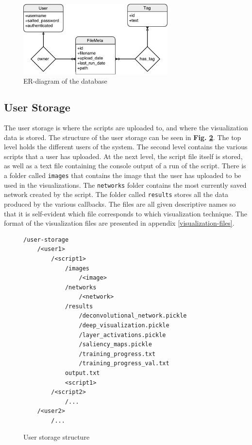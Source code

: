\begin{figure}[h!]
    \centering
        \includegraphics[width=0.7\textwidth]{fig/database-diagram.pdf}
        \caption{ER-diagram of the database}
        \label{database}
\end{figure}

\subsection{User Storage}

The user storage is where the scripts are uploaded to, and where the visualization data is stored. The structure of the user storage can be seen in \textbf{Fig. \ref{struct2}}. The top level holds the different users of the system. The second level contains the various scripts that a user has uploaded. At the next level, the script file itself is stored, as well as a text file containing the console output of a run of the script. There is a folder called \texttt{images} that contains the image that the user has uploaded to be used in the visualizations. The \texttt{networks} folder contains the most currently saved network created by the script. The folder called \texttt{results} stores all the data produced by the various callbacks. The files are all given descriptive names so that it is self-evident which file corresponds to which visualization technique. The format of the visualization files are presented in appendix \ref{visualization-files}.

\begin{figure}[h!]
\begin{verbatim}
/user-storage
    /<user1>
        /<script1>
            /images
                /<image>
            /networks
                /<network>
            /results
                /deconvolutional_network.pickle
                /deep_visualization.pickle
                /layer_activations.pickle
                /saliency_maps.pickle
                /training_progress.txt
                /training_progress_val.txt
            output.txt
            <script1>
        /<script2>
            /...
    /<user2>
        /...
\end{verbatim}
\caption{User storage structure}
\label{struct2}
\end{figure}

